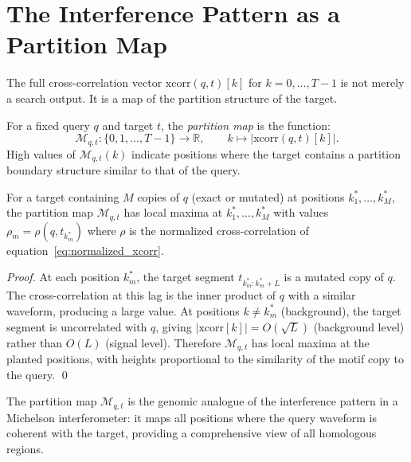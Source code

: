 \section{The Interference Pattern as a Partition Map}
\label{sec:interference_partition_map}

The full cross-correlation vector $\mathrm{xcorr}(q,t)[k]$ for $k = 0,\ldots,T-1$
is not merely a search output. It is a map of the partition structure of the target.

\begin{definition}
\label{def:partition_map}
For a fixed query $q$ and target $t$, the \emph{partition map} is the function:
\begin{equation}
  \mathcal{M}_{q,t} : \{0, 1, \ldots, T-1\} \to \mathbb{R},
  \qquad k \mapsto |\mathrm{xcorr}(q,t)[k]|.
  \label{eq:partition_map}
\end{equation}
High values of $\mathcal{M}_{q,t}(k)$ indicate positions where the target
contains a partition boundary structure similar to that of the query.
\end{definition}

\begin{proposition}
\label{prop:partition_map_detects}
For a target containing $M$ copies of $q$ (exact or mutated) at positions
$k_1^*, \ldots, k_M^*$, the partition map $\mathcal{M}_{q,t}$ has local maxima
at $k_1^*, \ldots, k_M^*$ with values $\rho_m = \rho(q, t_{k_m^*})$ where
$\rho$ is the normalized cross-correlation of equation~\eqref{eq:normalized_xcorr}.
\end{proposition}

\begin{proof}
At each position $k_m^*$, the target segment $t_{k_m^*:k_m^*+L}$ is a mutated
copy of $q$. The cross-correlation at this lag is the inner product of $q$ with
a similar waveform, producing a large value. At positions $k \neq k_m^*$
(background), the target segment is uncorrelated with $q$, giving
$|\mathrm{xcorr}[k]| = O(\sqrt{L})$ (background level) rather than $O(L)$
(signal level). Therefore $\mathcal{M}_{q,t}$ has local maxima at the planted
positions, with heights proportional to the similarity of the motif copy to
the query. \qed
\end{proof}

The partition map $\mathcal{M}_{q,t}$ is the genomic analogue of the
interference pattern in a Michelson interferometer: it maps all positions where
the query waveform is coherent with the target, providing a comprehensive view
of all homologous regions.


